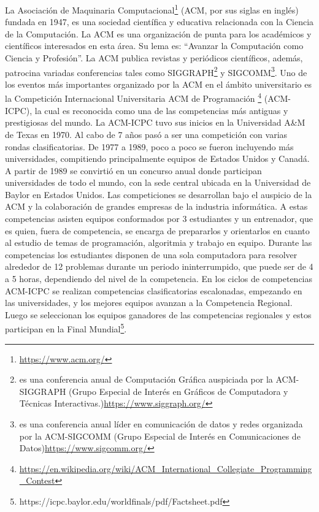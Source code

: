 \documentclass{report}
\begin{document}
La Asociaci\'on de Maquinaria Computacional\footnote{\hyperlink{ACM}{https://www.acm.org/}} (ACM, por sus siglas en ingl\'es) fundada en 1947, es una sociedad cient\'ifica y educativa relacionada con la Ciencia de la Computaci\'on. La ACM es una organizaci\'on de punta para los acad\'emicos y cient\'ificos interesados en esta \'area. Su lema es: ``Avanzar la Computaci\'on como Ciencia y Profesi\'on''. La ACM publica revistas y peri\'odicos cient\'ificos, adem\'as, patrocina variadas conferencias tales como SIGGRAPH\footnote{es una conferencia anual de Computaci\'on Gr\'afica auspiciada por la ACM-SIGGRAPH (Grupo Especial de Inter\'es en Gr\'aficos de Computadora y T\'ecnicas Interactivas.)\hyperlink{SIGGRAPH}{https://www.siggraph.org/}} y SIGCOMM\footnote{es una conferencia anual l\'ider en comunicaci\'on de datos y redes organizada por la ACM-SIGCOMM (Grupo Especial de Inter\'es en Comunicaciones de Datos)\hyperlink{SIGCOMM}{https://www.sigcomm.org/}}. Uno de los eventos m\'as importantes organizado por la ACM en el \'ambito universitario es la Competici\'on Internacional Universitaria ACM de Programaci\'on \footnote{\hyperlink{ACMICPC}{https://en.wikipedia.org/wiki/ACM\_International\_Collegiate\_Programming\_Contest}} (ACM-ICPC), la cual es reconocida como una de las competencias m\'as antiguas y prestigiosas del mundo.
La ACM-ICPC tuvo sus inicios en la Universidad A\&M de Texas en 1970. Al cabo de 7 a\~nos
pas\'o a ser una competici\'on con varias rondas clasificatorias. De 1977 a 1989, poco a poco se
fueron incluyendo m\'as universidades, compitiendo principalmente equipos de Estados Unidos y
Canad\'a. A partir de 1989 se convirti\'o en un concurso anual donde participan universidades de
todo el mundo, con la sede central ubicada en la Universidad de Baylor en Estados Unidos. Las
competiciones se desarrollan bajo el auspicio de la ACM y la colaboraci\'on de grandes empresas
de la industria inform\'atica. A estas competencias asisten equipos conformados por 3 estudiantes
y un entrenador, que es quien, fuera de competencia, se encarga de prepararlos y orientarlos
en cuanto al estudio de temas de programaci\'on, algoritmia y trabajo en equipo. Durante las
competencias los estudiantes disponen de una sola computadora para resolver alrededor de 12
problemas durante un periodo ininterrumpido, que puede ser de 4 a 5 horas, dependiendo del
nivel de la competencia. En los ciclos de competencias ACM-ICPC se realizan competencias
clasificatorias escalonadas, empezando en las universidades, y los mejores equipos avanzan a la
Competencia Regional. Luego se seleccionan los equipos ganadores de las competencias regionales y estos participan en la Final Mundial\footnote{https://icpc.baylor.edu/worldfinals/pdf/Factsheet.pdf}.\\
\end{document}
